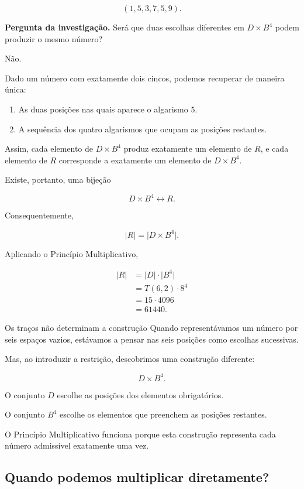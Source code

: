\documentclass[11pt,a4paper,oneside]{book}
\newcommand{\Pergunta}[1]{\begin{perguntabox}\textbf{Pergunta da investigação.} #1\end{perguntabox}}
\newcommand{\card}[1]{\lvert #1\rvert}
\begin{document}
\[
(1,5,3,7,5,9).
\]

\Pergunta{Será que duas escolhas diferentes
em $D\times B^4$ podem produzir
o mesmo número?}

Não.

Dado um número com exatamente dois cincos,
podemos recuperar de maneira única:

\begin{enumerate}
\item As duas posições nas quais
aparece o algarismo $5$.

\item A sequência dos quatro algarismos
que ocupam as posições restantes.
\end{enumerate}

Assim, cada elemento de $D\times B^4$
produz exatamente um elemento de $R$,
e cada elemento de $R$ corresponde
a exatamente um elemento de $D\times B^4$.

Existe, portanto, uma bijeção

\[
\boxed{D\times B^4\longleftrightarrow R}.
\]

Consequentemente,

\[
\card R=\card{D\times B^4}.
\]

Aplicando o Princípio Multiplicativo,

\[
\begin{aligned}
\card R
&=\card D\cdot\card{B^4}\\
&=T(6,2)\cdot8^4\\
&=15\cdot4096\\
&=\boxed{61440}.
\end{aligned}
\]

\begin{descobertabox}{Os traços não determinam a construção}
Quando representávamos um número
por seis espaços vazios, estávamos
a pensar nas seis posições como
escolhas sucessivas.

Mas, ao introduzir a restrição,
descobrimos uma construção diferente:

\[
D\times B^4.
\]

O conjunto $D$ escolhe as posições
dos elementos obrigatórios.

O conjunto $B^4$ escolhe
os elementos que preenchem
as posições restantes.

O Princípio Multiplicativo
funciona porque esta construção
representa cada número admissível
exatamente uma vez.
\end{descobertabox}

\subsection*{Quando podemos multiplicar diretamente?}
\end{document}
